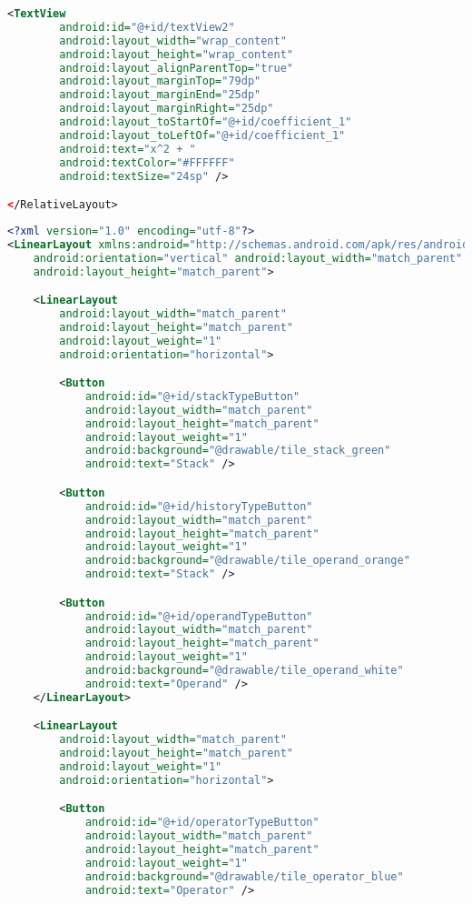 \begin{lstlisting}[caption=input\_polynomial.xml,label=list:input_polynomial.xml,language=XML]
    <TextView
        android:id="@+id/textView2"
        android:layout_width="wrap_content"
        android:layout_height="wrap_content"
        android:layout_alignParentTop="true"
        android:layout_marginTop="79dp"
        android:layout_marginEnd="25dp"
        android:layout_marginRight="25dp"
        android:layout_toStartOf="@+id/coefficient_1"
        android:layout_toLeftOf="@+id/coefficient_1"
        android:text="x^2 + "
        android:textColor="#FFFFFF"
        android:textSize="24sp" />

</RelativeLayout>
\end{lstlisting}    

\begin{lstlisting}[caption=input\_tile\_type.xml,label=list:input_tile_type.xml,language=XML]
<?xml version="1.0" encoding="utf-8"?>
<LinearLayout xmlns:android="http://schemas.android.com/apk/res/android"
    android:orientation="vertical" android:layout_width="match_parent"
    android:layout_height="match_parent">

    <LinearLayout
        android:layout_width="match_parent"
        android:layout_height="match_parent"
        android:layout_weight="1"
        android:orientation="horizontal">

        <Button
            android:id="@+id/stackTypeButton"
            android:layout_width="match_parent"
            android:layout_height="match_parent"
            android:layout_weight="1"
            android:background="@drawable/tile_stack_green"
            android:text="Stack" />

        <Button
            android:id="@+id/historyTypeButton"
            android:layout_width="match_parent"
            android:layout_height="match_parent"
            android:layout_weight="1"
            android:background="@drawable/tile_operand_orange"
            android:text="Stack" />

        <Button
            android:id="@+id/operandTypeButton"
            android:layout_width="match_parent"
            android:layout_height="match_parent"
            android:layout_weight="1"
            android:background="@drawable/tile_operand_white"
            android:text="Operand" />
    </LinearLayout>

    <LinearLayout
        android:layout_width="match_parent"
        android:layout_height="match_parent"
        android:layout_weight="1"
        android:orientation="horizontal">

        <Button
            android:id="@+id/operatorTypeButton"
            android:layout_width="match_parent"
            android:layout_height="match_parent"
            android:layout_weight="1"
            android:background="@drawable/tile_operator_blue"
            android:text="Operator" />


\end{lstlisting}
